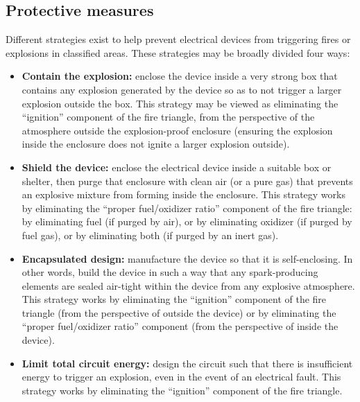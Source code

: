 









\filbreak
\subsection{Protective measures}

Different strategies exist to help prevent electrical devices from triggering fires or explosions in classified areas.  These strategies may be broadly divided four ways: 

\begin{itemize}
\item \textbf{Contain the explosion:} enclose the device inside a very strong box that contains any explosion generated by the device so as to not trigger a larger explosion outside the box.  This strategy may be viewed as eliminating the ``ignition'' component of the fire triangle, from the perspective of the atmosphere outside the explosion-proof enclosure (ensuring the explosion inside the enclosure does not ignite a larger explosion outside).
\item \textbf{Shield the device:} enclose the electrical device inside a suitable box or shelter, then purge that enclosure with clean air (or a pure gas) that prevents an explosive mixture from forming inside the enclosure.  This strategy works by eliminating the ``proper fuel/oxidizer ratio'' component of the fire triangle: by eliminating fuel (if purged by air), or by eliminating oxidizer (if purged by fuel gas), or by eliminating both (if purged by an inert gas).
\item \textbf{Encapsulated design:} manufacture the device so that it is self-enclosing.  In other words, build the device in such a way that any spark-producing elements are sealed air-tight within the device from any explosive atmosphere.  This strategy works by eliminating the ``ignition'' component of the fire triangle (from the perspective of outside the device) or by eliminating the ``proper fuel/oxidizer ratio'' component (from the perspective of inside the device).
\item \textbf{Limit total circuit energy:} design the circuit such that there is insufficient energy to trigger an explosion, even in the event of an electrical fault.  This strategy works by eliminating the ``ignition'' component of the fire triangle.
\end{itemize}

